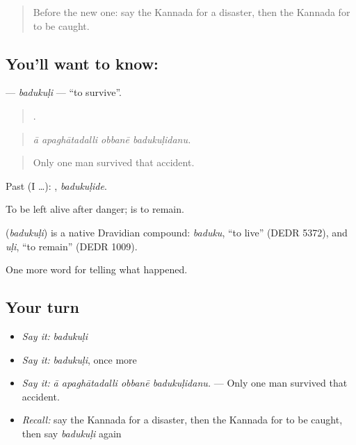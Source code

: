 \label{lesson:KA-C332-badukuli}



\begin{quote}
Before the new one: say the Kannada for a disaster, then the Kannada for to be caught.
\end{quote}

\subsection*{You'll want to know: }
\textbf{} — \emph{badukuḷi} — \textquotedblleft{}to survive\textquotedblright{}.

\begin{quote}
   .
\end{quote}

\begin{quote}
\emph{ā apaghātadalli obbanē badukuḷidanu.}
\end{quote}

\begin{quote}
Only one man survived that accident.
\end{quote}

Past (I …): , \emph{badukuḷide}.

To be left alive after danger;  is to remain.

\begin{cousinweb}
\textbf{} (\emph{badukuḷi}) is a native Dravidian compound: \emph{baduku}, \textquotedblleft{}to live\textquotedblright{} (DEDR 5372), and \emph{uḷi}, \textquotedblleft{}to remain\textquotedblright{} (DEDR 1009).
\end{cousinweb}

\begin{grammarlens}[title={What you've built}]
One more word for telling what happened.
\end{grammarlens}

\subsection*{Your turn}
\begin{itemize}
\raggedright
  \item \emph{Say it:} \emph{badukuḷi}
  \item \emph{Say it:} \emph{badukuḷi}, once more
  \item \emph{Say it:} \emph{ā apaghātadalli obbanē badukuḷidanu.} — Only one man survived that accident.
  \item \emph{Recall:} say the Kannada for a disaster, then the Kannada for to be caught, then say \emph{badukuḷi} again
\end{itemize}


